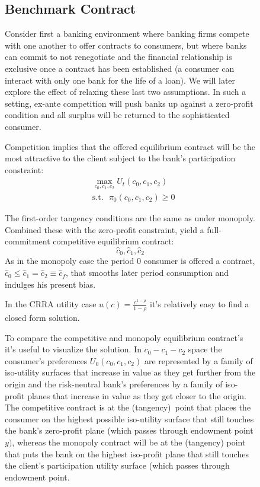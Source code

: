 \documentclass[11pt]{article}%
\begin{document}
\begin{figure}
{ 
 




\subsection{Benchmark Contract}

Consider first a banking environment where banking firms compete with one another to offer contracts to consumers, but where banks can commit to not renegotiate and the financial relationship is exclusive once a contract has been established (a consumer can interact with only one
bank for the life of a loan). We will later explore the effect of relaxing these last two assumptions. In such a  setting,   ex-ante competition will push banks up against a zero-profit condition
and all surplus will be returned to
the sophisticated consumer.

Competition implies that the  offered equilibrium contract will be the most attractive  to the client subject to the bank's participation constraint:%
\begin{align*}
&  \max_{c_{0},c_{1},c_{2}}U_{t}\left(  c_{0},c_{1},c_{2}\right) \\
&  \text{s}\text{.t}\text{.}\text{ }\pi_{0}\left(  c_{0},c_{1},c_{2}\right)
\geq0
\end{align*}


The first-order tangency conditions are the same as under monopoly. Combined these with the
zero-profit constraint, yield a full-commitment competitive equilibrium contract:%
\[
\hat{c}_{0},\hat{c}_{1},\hat{c}_{2}%
\]
As in the monopoly case the period 0 consumer is offered a contract, 
\(\hat{c}_{0}\leq\hat{c}_{1}=\hat{c}_{2}\equiv\hat{c}_{f}\), that smooths later period consumption and indulges his present bias. 

In the CRRA utility case $u(c)=\frac{c^{1-\rho }}{1-\rho }$ it's relatively easy to find a closed form solution. 

To compare the competitive and  monopoly equilibrium contract's it's useful to visualize the solution.  In $c_{0}-c_{1}-c_{2}$ space  the consumer's preferences \(U_{0}(c_{0},c_{1},c_{2})\)  are represented by a family of iso-utility surfaces
that increase in value as they get further from the origin and the risk-neutral bank's preferences by a family of iso-profit planes that increase in value as they get closer to the origin. The competitive contract is at the (tangency)\ point that places  the consumer on the highest possible iso-utility surface that still touches the bank's zero-profit plane (which passes through  endowment point \(y)\), whereas the monopoly contract will be  at the (tangency) point that puts the bank on the highest iso-profit plane that still touches the client's participation utility surface (which passes through endowment point. \begin{figure}[ptb]
\centering
{}


\end{figure}}
\end{figure}
\end{document}
